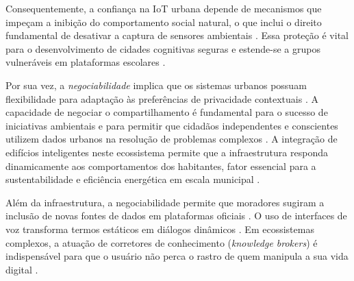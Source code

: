 \documentclass[
	12pt,				%
	oneside,			%
	a4paper,			%
	english,			%
	brazil				%
	]{abntex2ppgsi}
\begin{document}
    Consequentemente, a confiança na IoT urbana depende de mecanismos que impeçam a inibição do comportamento social natural, o que inclui o direito fundamental de desativar a captura de sensores ambientais \cite{DOWTHWAITE2024, Brombacher20221863, Bowyer2022, Crabtree2021, Zou2020769, Crabtree2016}. Essa proteção é vital para o desenvolvimento de cidades cognitivas seguras e estende-se a grupos vulneráveis em plataformas escolares \cite{hayes2024making, Meechan2023, Royle2023, Payne2023, Strey2019Human}.

    Por sua vez, a \emph{negociabilidade} implica que os sistemas urbanos possuam flexibilidade para adaptação às preferências de privacidade contextuais \cite{DOWTHWAITE2024, Nelson2023}. A capacidade de negociar o compartilhamento é fundamental para o sucesso de iniciativas ambientais e para permitir que cidadãos independentes e conscientes utilizem dados urbanos na resolução de problemas complexos \cite{Belizario2023Interacao}. A integração de edifícios inteligentes neste ecossistema permite que a infraestrutura responda dinamicamente aos comportamentos dos habitantes, fator essencial para a sustentabilidade e eficiência energética em escala municipal \cite{bavaresco2019technological}. 

    Além da infraestrutura, a negociabilidade permite que moradores sugiram a inclusão de novas fontes de dados em plataformas oficiais \cite{Elhamdadi2022, Xiao2021, Koesten2021, Hornung2015}. O uso de interfaces de voz transforma termos estáticos em diálogos dinâmicos \cite{Sailaja2024334, Chowdhury2016}. Em ecossistemas complexos, a atuação de corretores de conhecimento (\textit{knowledge brokers}) é indispensável para que o usuário não perca o rastro de quem manipula a sua vida digital \cite{Seidelin2018}.
\end{document}
